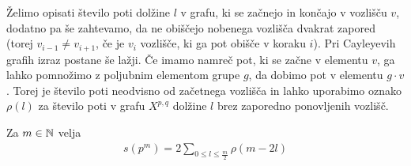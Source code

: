 Želimo opisati število poti dolžine \(l\) v grafu, ki se začnejo in končajo v vozlišču \(v\), dodatno pa še zahtevamo, da ne obiščejo nobenega vozlišča dvakrat zapored (torej \(v_{i-1}\neq v_{i+1}\), če je \(v_i\) vozlišče, ki ga pot obišče v koraku \(i\)). Pri Cayleyevih grafih izraz postane še lažji. Če imamo namreč pot, ki se začne v elementu \(v\), ga lahko pomnožimo z poljubnim elementom grupe \(g\), da dobimo pot v elementu \(g\cdot v\). Torej je število poti neodvisno od začetnega vozlišča in lahko uporabimo oznako \(\rho(l)\) za število poti v grafu \(X^{p,q}\) dolžine \(l\) brez zaporedno ponovljenih vozlišč.

\begin{izrek}
    Za \(m\in \mathbb N\) velja
    \begin{align*}
        s(p^m) = 2\sum_{0\leq l\leq \frac{m}{2}}\rho(m-2l)
    \end{align*}
\end{izrek}

